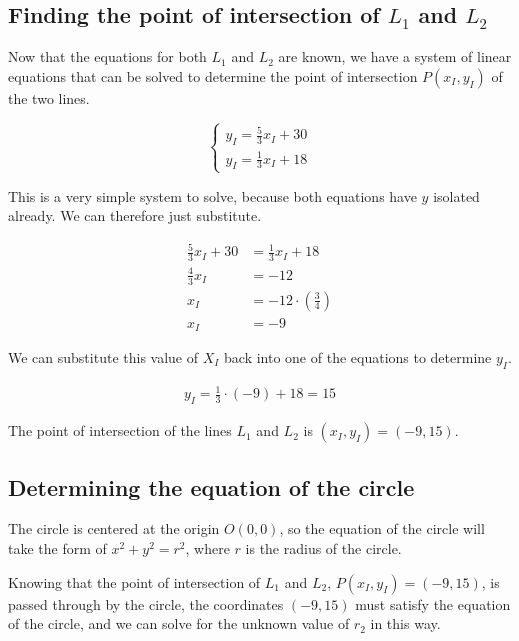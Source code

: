 \documentclass[12pt]{article}
\begin{document}
\subsection{Finding the point of intersection of $L_1$ and $L_2$}

Now that the equations for both $L_1$ and $L_2$ are known, we have a system of linear equations that can be solved to determine the point of intersection $P(x_I, y_I)$ of the two lines.

\begin{equation}
\begin{cases}
y_I = \frac{5}{3}x_I + 30\\
y_I = \frac{1}{3}x_I + 18
\end{cases}
\end{equation}

This is a very simple system to solve, because both equations have $y$ isolated already. We can therefore just substitute.

\begin{equation}\begin{split}
\frac{5}{3}x_I + 30 &= \frac{1}{3}x_I + 18\\
\frac{4}{3}x_I &= -12\\
x_I &= -12\cdot\left(\frac{3}{4}\right)\\
x_I &= -9
\end{split}\end{equation}

We can substitute this value of $X_I$ back into one of the equations to determine $y_I$.

\begin{equation}\begin{split}
y_I = \frac{1}{3}\cdot (-9) + 18 = 15
\end{split}\end{equation}

The point of intersection of the lines $L_1$ and $L_2$ is $(x_I, y_I)=(-9, 15)$.

\newpage

\subsection{Determining the equation of the circle}

The circle is centered at the origin $O(0,0)$, so the equation of the circle will take the form of $x^2 + y^2 = r^2$, where $r$ is the radius of the circle.

Knowing that the point of intersection of $L_1$ and $L_2$, $P(x_I, y_I)=(-9, 15)$, is passed through by the circle, the coordinates $(-9, 15)$ must satisfy the equation of the circle, and we can solve for the unknown value of $r_2$ in this way.
\end{document}

